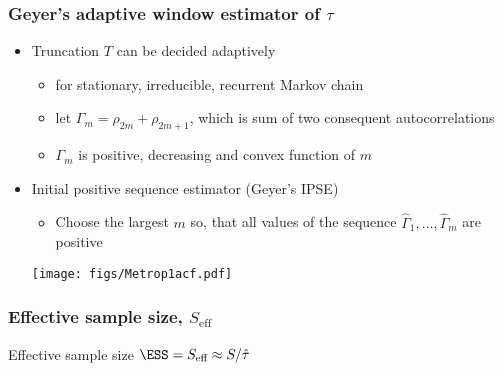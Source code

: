 \documentclass[10pt]{beamer}
\begin{document}
\begin{frame}

\frametitle{Geyer's adaptive window estimator of $\tau$}

  \begin{itemize}
  \item Truncation $T$ can be decided adaptively
    \begin{itemize}
    \item for stationary, irreducible, recurrent Markov chain
    \item let $\Gamma_m=\rho_{2m}+\rho_{2m+1}$, which is sum of two
      consequent autocorrelations
    \item $\Gamma_m$ is positive, decreasing and convex function of $m$
    \end{itemize}
    \vspace{0.5\baselineskip}
  \item<2-> Initial positive sequence estimator (Geyer's IPSE)
      \begin{itemize}
        \item Choose the largest $m$ so, that all values of the sequence
        $\hat{\Gamma}_1, \ldots, \hat{\Gamma}_m$ are positive
      \end{itemize}
  \vspace{0.5\baselineskip}
      \texttt{[image: figs/Metrop1acf.pdf]}
  \end{itemize}
\end{frame}


\begin{frame}

 \frametitle{Effective sample size, $S_\text{eff}$}

   Effective sample size $\ESS = S_\text{eff} \approx S/\hat{\tau}$\\

\end{frame}
\end{document}
